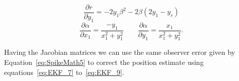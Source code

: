   \begin{equation}
	\frac{\partial r}{\partial y_1} = -2y_1\beta^2 - 2\beta(2y_1-y_r)
	\end{equation}
  \begin{equation}
  \frac{\partial \alpha}{\partial x_1} =  \frac{-y_1}{x_1^2+y_1^2}\qquad
	\frac{\partial \alpha}{\partial y_1} =
	\frac{x_1}{x_1^2+y_1^2} .
	\end{equation}


Having the Jacobian matrices we can use the same observer error given by Equation~\ref{eq:SpikeMath5} to correct the position estimate using equations~\ref{eq:EKF_7} to~\ref{eq:EKF_9}.

